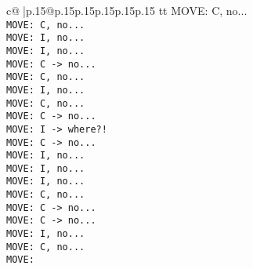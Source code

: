 \documentclass{article}
\begin{document}
{\begin{supertabular}{c@{$\;$}|p{.15\linewidth}@{}p{.15\linewidth}p{.15\linewidth}p{.15\linewidth}p{.15\linewidth}p{.15\linewidth}}
{{{tt  MOVE: C, no...\\ \tt  MOVE: C, no...\\ \tt  MOVE: I, no...\\ \tt  MOVE: I, no...\\ \tt  MOVE: C -> no...\\ \tt  MOVE: C, no...\\ \tt  MOVE: I, no...\\ \tt  MOVE: C, no...\\ \tt  MOVE: C -> no...\\ \tt  MOVE: I -> where?!\\ \tt  MOVE: C -> no...\\ \tt  MOVE: I, no...\\ \tt  MOVE: I, no...\\ \tt  MOVE: I, no...\\ \tt  MOVE: C, no...\\ \tt  MOVE: C -> no...\\ \tt  MOVE: C -> no...\\ \tt  MOVE: I, no...\\ \tt  MOVE: C, no...\\ \tt  MOVE:}}}
\end{supertabular}}
\end{document}
